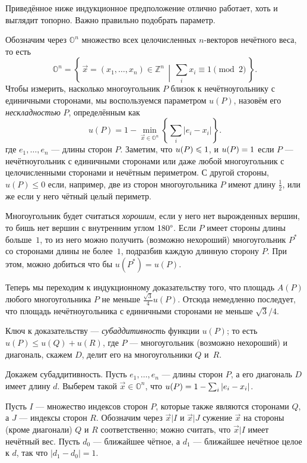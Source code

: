 Приведённое ниже индукционное предположение отлично работает, хоть и выглядит топорно. Важно правильно подобрать параметр.

Обозначим через $\mathbb{O}^n$ множество всех целочисленных $n$-векторов нечётного веса, то есть 
\[\mathbb{O}^n=\left\{\,\vec x=(x_1,\dots,x_n)\in \mathbb{Z}^n\,\middle|\, \sum_ix_i\equiv 1\pmod 2\,\right\}.\]
Чтобы измерить, насколько многоугольник $P$ близок к нечётноугольнику с единичными сторонами, мы воспользуемся параметром $u(P)$, назовём его \emph{нескладностью} $P$, определённым как
\[u(P)=1-\min_{\vec x\in \mathbb{O}^n} \left\{\sum_i |e_i-x_i|\right\}.\]
где  $e_1,\dots,e_n$ --- длины сторон $P$.
Заметим, что $u(P)\z\leqslant1$, и $u(P)\z=1$ если $P$ --- нечётноугольник с единичными сторонами или даже любой многоугольник с целочисленными сторонами и нечётным периметром.
С другой стороны, $u(P)\leqslant 0$ если, например, две из сторон многоугольника $P$ имеют длину $\tfrac12$, или же если у него чётный целый периметр.

Многоугольник будет считаться \emph{хорошим}, если у него нет вырожденных вершин, то бишь нет вершин с внутренним углом $180\degree$.
Если $P$ имеет стороны длины больше~$1$, то из него можно получить (возможно нехороший) многоугольник $P^*$ со сторонами длины не более~$1$, подразбив каждую длинную сторону $P$.
При этом, можно добиться что бы $u(P^*)=u(P)$.

Теперь мы переходим к индукционному доказательству того, что площадь $A(P)$ любого многоугольника $P$ не меньше $\tfrac{\sqrt{3}}{4}u(P)$.
Отсюда немедленно последует, что площадь нечётноугольника с единичными сторонами не меньше  $\sqrt{3}/4$.

Ключ к доказательству --- \emph{субаддитивность} функции $u(P)$;
то есть $u(P)\leqslant u(Q)+u(R)$, где $P$ --- многоугольник (возможно нехороший) и диагональ, скажем $D$, делит его на многоугольники $Q$ и~$R$.

Докажем субаддитивность.
Пусть  $e_1,\dots,e_n$ --- длины сторон $P$, а его диагональ $D$ имеет длину $d$. 
Выберем такой $\vec x\in\mathbb{O}^n$, что $u(P)\z=1-\sum_i |e_i-x_i|$.

Пусть $I$ --- множество индексов сторон $P$, которые также являются сторонами $Q$, а $J$ --- индексы сторон $R$.
Обозначим через $\vec x|I$ и $\vec x|J$ сужение $\vec x$ на стороны (кроме диагонали) $Q$ и $R$ соответственно;
можно считать, что $\vec x|I$ имеет нечётный вес.
Пусть $d_0$ --- ближайшее чётное, а $d_1$ --- ближайшее нечётное целое к $d$, так что $|d_1-d_0|=1$.

